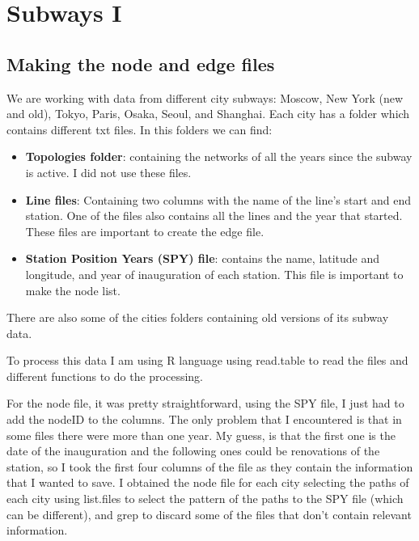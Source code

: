 \chapter{Subways I}



\section{Making the node and edge files}
 
We are working with data from different city subways: Moscow, New York (new and old), Tokyo, Paris, Osaka, Seoul, and Shanghai. Each city has a folder which contains different txt files. In this folders we can find:

\begin{itemize}
    \item \textbf{Topologies folder}: containing the networks of all the years since the subway is active. I did not use these files.
    \item \textbf{Line files}: Containing two columns with the name of the line's start and end station. One of the files also contains all the lines and the year that started. These files are important to create the edge file.
    \item \textbf{Station Position Years (SPY) file}: contains the name, latitude and longitude, and year of inauguration of each station. This file is important to make the node list.
\end{itemize}
    
There are also some of the cities folders containing old versions of its subway data. 

To process this data I am using R language using read.table to read the files and different functions to do the processing.


For the node file, it was pretty straightforward, using the SPY file, I just had to add the nodeID to the columns. The only problem that I encountered is that in some files there were more than one year. My guess, is that the first one is the date of the inauguration and the following ones could be renovations of the station, so I took the first four columns of the file as they contain the information that I wanted to save. I obtained the node file for each city selecting the paths of each city using list.files to select the pattern of the paths to the SPY file (which can be different), and grep to discard some of the files that don't contain relevant information.


